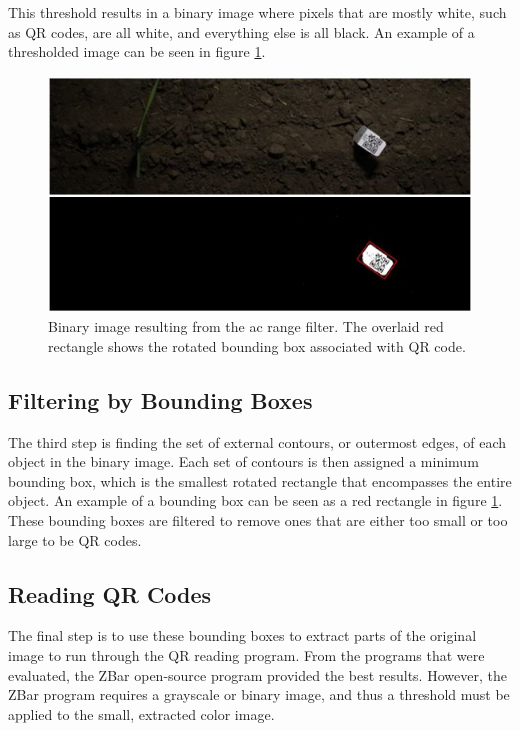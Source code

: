 This threshold results in a binary image where pixels that are mostly white, such as QR codes, are all white, and everything else is all black.  An example of a thresholded image can be seen in figure \ref{figure:code_extraction}.

\begin{figure}
	\centering
    \includegraphics[width=5in]{figures/code_extraction_step1.jpg}
    \caption[Threshold image]{Binary image resulting from the \ac{ac} range filter.  The overlaid red rectangle shows the rotated bounding box associated with QR code.}
    \label{figure:code_extraction}
\end{figure} 

\subsection{Filtering by Bounding Boxes}

The third step is finding the set of external contours, or outermost edges, of each object in the binary image.  Each set of contours is then assigned a minimum bounding box, which is the smallest rotated rectangle that encompasses the entire object.  An example of a bounding box can be seen as a red rectangle in figure \ref{figure:code_extraction}.  These bounding boxes are filtered to remove ones that are either too small or too large to be QR codes.

\subsection{Reading QR Codes}
\label{section:reading_codes}

The final step is to use these bounding boxes to extract parts of the original image to run through the QR reading program.  From the programs that were evaluated, the ZBar open-source program provided the best results.  However, the ZBar program requires a grayscale or binary image, and thus a threshold must be applied to the small, extracted color image. 

